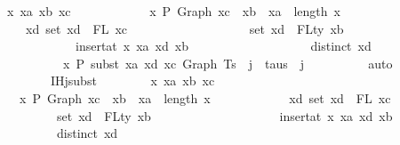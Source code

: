 \begin{isabellebody}
\ \ \ \ \ \ \ \ \ {\isacharparenleft}{\kern0pt}{\isasymforall}x\ xa\ xb\ xc{\isachardot}{\kern0pt}\isanewline
\ \ \ \ \ \ \ \ \ \ \ \ x\ {\isasymturnstile}{\isacharbraceleft}{\kern0pt}P{\isacharbraceright}{\kern0pt}\ Graph\ xc\ {\isacharcolon}{\kern0pt}\ xb\ {\isasymlongrightarrow}\ xa\ {\isasymle}\ length\ x\ {\isasymlongrightarrow}\isanewline
\ \ \ \ \ \ \ \ \ \ \ \ {\isacharparenleft}{\kern0pt}{\isasymforall}xd{\isachardot}{\kern0pt}\ set\ xd\ {\isacharequal}{\kern0pt}\ FL\ xc\ {\isasymlongrightarrow}\isanewline
\ \ \ \ \ \ \ \ \ \ \ \ \ \ \ \ \ \ set\ xd\ {\isacharequal}{\kern0pt}\ FLty\ xb\ {\isasymlongrightarrow}\isanewline
\ \ \ \ \ \ \ \ \ \ \ \ \ \ \ \ \ \ {\isasymGamma}\ {\isacharequal}{\kern0pt}\ insert{\isacharunderscore}{\kern0pt}at\ x\ xa\ {\isacharparenleft}{\kern0pt}xd{\isacharcomma}{\kern0pt}\ xb{\isacharparenright}{\kern0pt}\ {\isasymlongrightarrow}\isanewline
\ \ \ \ \ \ \ \ \ \ \ \ \ \ \ \ \ \ distinct\ xd\ {\isasymlongrightarrow}\isanewline
\ \ \ \ \ \ \ \ \ \ \ \ \ \ \ \ \ \ x\ {\isasymturnstile}{\isacharbraceleft}{\kern0pt}P{\isacharbraceright}{\kern0pt}\ subst\ xa\ xd\ xc\ {\isacharparenleft}{\kern0pt}Graph\ {\isacharparenleft}{\kern0pt}Ts\ {\isacharbang}{\kern0pt}\ j{\isacharparenright}{\kern0pt}{\isacharparenright}{\kern0pt}\ {\isacharcolon}{\kern0pt}\ taus\ {\isacharbang}{\kern0pt}\ j{\isacharparenright}{\kern0pt}{\isacharparenright}{\kern0pt}{\isachardoublequoteclose}\isanewline
\ \ \ \ \ \ \ \ \isamarkupfalse%
\ auto\isanewline
\isanewline
\ \ \ \ \ \ \isanewline
\ \ \ \ \ \ \isamarkupfalse%
\ \isamarkupfalse%
\ IHj{\isacharunderscore}{\kern0pt}subst{\isacharcolon}{\kern0pt}\isanewline
\ \ \ \ \ \ \ \ {\isachardoublequoteopen}{\isasymforall}x\ xa\ xb\ xc{\isachardot}{\kern0pt}\isanewline
\ \ \ \ \ \ \ \ \ \ \ x\ {\isasymturnstile}{\isacharbraceleft}{\kern0pt}P{\isacharbraceright}{\kern0pt}\ Graph\ xc\ {\isacharcolon}{\kern0pt}\ xb\ {\isasymlongrightarrow}\ xa\ {\isasymle}\ length\ x\ {\isasymlongrightarrow}\isanewline
\ \ \ \ \ \ \ \ \ \ \ {\isacharparenleft}{\kern0pt}{\isasymforall}xd{\isachardot}{\kern0pt}\ set\ xd\ {\isacharequal}{\kern0pt}\ FL\ xc\ {\isasymlongrightarrow}\isanewline
\ \ \ \ \ \ \ \ \ \ \ \ \ \ \ \ \ set\ xd\ {\isacharequal}{\kern0pt}\ FLty\ xb\ {\isasymlongrightarrow}\isanewline
\ \ \ \ \ \ \ \ \ \ \ \ \ \ \ \ \ {\isasymGamma}\ {\isacharequal}{\kern0pt}\ insert{\isacharunderscore}{\kern0pt}at\ x\ xa\ {\isacharparenleft}{\kern0pt}xd{\isacharcomma}{\kern0pt}\ xb{\isacharparenright}{\kern0pt}\ {\isasymlongrightarrow}\isanewline
\ \ \ \ \ \ \ \ \ \ \ \ \ \ \ \ \ distinct\ xd\ {\isasymlongrightarrow}\isanewline

\end{isabellebody}
